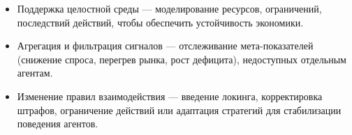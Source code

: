 \documentclass[
    14pt,
    specialist,
    candidate, %
    subf, %
    href,
    dotsinheaders=false
]{disser}
\begin{document}






















\begin{itemize}
  \item Поддержка целостной среды — моделирование ресурсов, ограничений, последствий действий, чтобы обеспечить устойчивость экономики.
  \item Агрегация и фильтрация сигналов — отслеживание мета-показателей (снижение спроса, перегрев рынка, рост дефицита), недоступных отдельным агентам.
  \item Изменение правил взаимодействия — введение локинга, корректировка штрафов, ограничение действий или адаптация стратегий для стабилизации поведения агентов.
\end{itemize}










\end{document}
